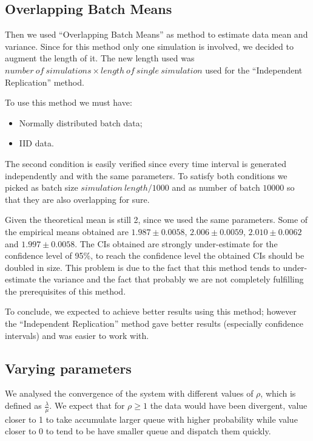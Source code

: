 \documentclass[10pt,a4paper]{article}
\begin{document}
\subsection*{Overlapping Batch Means}

Then we used ``Overlapping Batch Means'' as method to estimate data mean and variance. Since for this method only one simulation is involved, we decided to augment the length of it. The new length used was \(\mathit{number~of~simulations}\times\mathit{length~of~single~simulation}\) used for the ``Independent Replication'' method.

To use this method we must have:
\begin{itemize}
\item Normally distributed batch data;
\item IID data.
\end{itemize}

The second condition is easily verified since every time interval is generated independently and with the same parameters. To satisfy both conditions we picked as batch size \(\mathit{simulation~length} / 1000\) and as number of batch \(10000\) so that they are also overlapping for sure.

Given the theoretical mean is still 2, since we used the same parameters. Some of the empirical means obtained are \( 1.987 \pm 0.0058\), \(2.006 \pm 0.0059\), \(2.010 \pm 0.0062\) and \(1.997 \pm 0.0058\). The CIs obtained are strongly under-estimate for the confidence level of 95\%, to reach the confidence level the obtained CIs should be doubled in size. This problem is due to the fact that this method tends to under-estimate the variance and the fact that probably we are not completely fulfilling the prerequisites of this method.

To conclude, we expected to achieve better results using this method; however the ``Independent Replication'' method gave better results (especially confidence intervals) and was easier to work with.

\subsection*{Varying parameters}

We analysed the convergence of the system with different values of \(\rho\), which is defined as \(\frac \lambda \mu\). We expect that for \(\rho \ge 1\) the data would have been divergent, value closer to 1 to take accumulate larger queue with higher probability while value closer to 0 to tend to be have smaller queue and dispatch them quickly.
\end{document}
